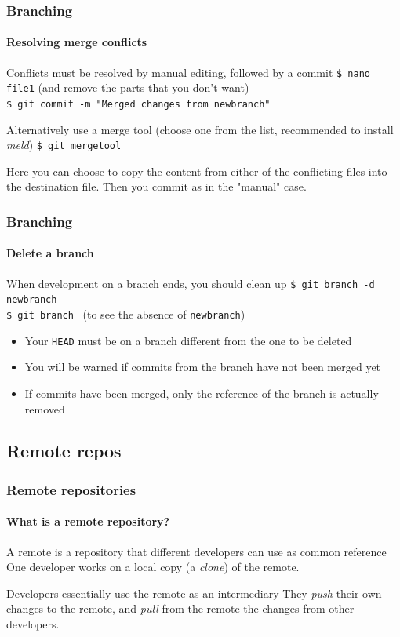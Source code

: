\begin{frame}
\frametitle{Branching}
\framesubtitle{Resolving merge conflicts}

\begin{block}{Conflicts must be resolved by manual editing, followed by a commit}
\texttt{\$ nano file1} (and remove the parts that you don't want)\\
\texttt{\$ git commit -m "Merged changes from newbranch"}\\
\end{block}
\pause
\begin{block}{Alternatively use a merge tool (choose one from the list, recommended to install {\em meld})}
\texttt{\$ git mergetool}

\medskip
Here you can choose to copy the content from either of the conflicting files into the destination file. Then you commit as in the "manual" case.
\end{block}

\end{frame}

\begin{frame}
\frametitle{Branching}
\framesubtitle{Delete a branch}

\begin{block}{When development on a branch ends, you should clean up}
\texttt{\$ git branch -d newbranch} \\
\texttt{\$ git branch} \,\,\,(to see the absence of \texttt{newbranch})

\medskip
\begin{itemize}
\item Your \texttt{HEAD} must be on a branch different from the one to be deleted
\item You will be warned if commits from the branch have not been merged yet
\item If commits have been merged, only the reference of the branch is actually removed
\end{itemize}
\end{block}

\end{frame}

\subsection{Remote repos}

\begin{frame}
\frametitle{Remote repositories}
\framesubtitle{What is a remote repository?}

\begin{block}{A remote is a repository that different developers can use as common reference}
One developer works on a local copy (a {\em clone}) of the remote.
\end{block}
\begin{block}{Developers essentially use the remote as an intermediary}
They {\em push} their own changes to the remote, and {\em pull} from the remote the changes from other developers.
\end{block}

\end{frame}

